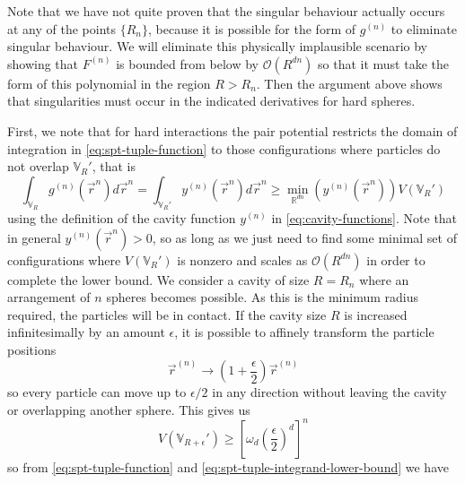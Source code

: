 \documentclass[11pt]{report}
\begin{document}
Note that we have not quite proven that the singular behaviour actually occurs at any of the points $\{R_n\}$, because it is possible for the form of $g^{(n)}$ to eliminate singular behaviour.
We will eliminate this physically implausible scenario by showing that $F^{(n)}$ is bounded from below by $\mathcal{O}(R^{dn})$ so that it must take the form of this polynomial in the region $R > R_n$.
Then the argument above shows that singularities must occur in the indicated derivatives for hard spheres.

First, we note that for hard interactions the pair potential restricts the domain of integration in \eqref{eq:spt-tuple-function} to those configurations where particles do not overlap $\mathbb{V}_R'$, that is
\begin{equation}\label{eq:spt-tuple-integrand-lower-bound}
  \int_{\mathbb{V}_R} g^{(n)}(\vec{r}^n) d\vec{r}^n =
  \int_{\mathbb{V}_R'} y^{(n)}(\vec{r}^n) d\vec{r}^n \ge
  \min_{\mathbb{R}^{dn}}{\left(y^{(n)}(\vec{r}^n)\right)} V(\mathbb{V}_R')
\end{equation}
using the definition of the cavity function $y^{(n)}$ in \eqref{eq:cavity-functions}.
Note that in general $y^{(n)}(\vec{r}^n) > 0$, so as long as we just need to find some minimal set of configurations where $V(\mathbb{V}_R')$ is nonzero and scales as $\mathcal{O}(R^{dn})$ in order to complete the lower bound.
We consider a cavity of size $R=R_n$ where an arrangement%
of $n$ spheres becomes possible.
As this is the minimum radius required, the particles will be in contact.
If the cavity size $R$ is increased infinitesimally by an amount $\epsilon$, it is possible to affinely transform the particle positions
\begin{equation*}
  \vec{r}^{(n)} \to \left(1 + \frac{\epsilon}{2}\right) \vec{r}^{(n)}
\end{equation*}
so every particle can move up to $\epsilon/2$ in any direction without leaving the cavity or overlapping another sphere.
This gives us
\begin{equation*}
  V\left(\mathbb{V}_{R+\epsilon}'\right) \ge
  \left[ \omega_d \left(\frac{\epsilon}{2}\right)^d \right]^n
\end{equation*}
so from \eqref{eq:spt-tuple-function} and \eqref{eq:spt-tuple-integrand-lower-bound} we have
\end{document}
